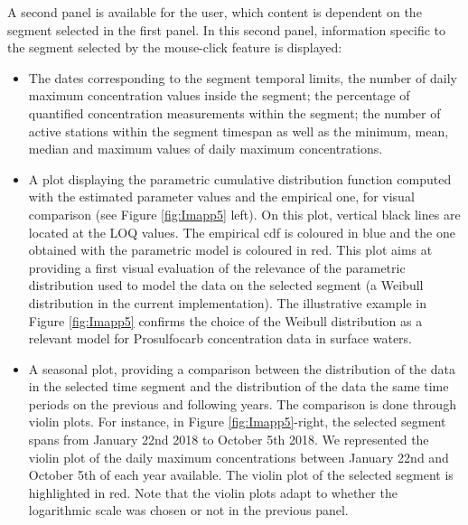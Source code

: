 A second panel is available for the user, which content is dependent on the segment selected in the first panel. In this second panel, information specific to the segment selected by the mouse-click feature is displayed:
\begin{itemize}
\item The dates corresponding to the segment temporal limits, the number of daily maximum concentration values inside the segment; the percentage of quantified concentration measurements within the segment; the number of active stations within the segment timespan as well as the minimum, mean, median and maximum values of daily maximum concentrations. 
\item A plot displaying the parametric cumulative distribution function computed with the estimated parameter values and the empirical one, for visual comparison (see Figure \ref{fig:Imapp5} left). On this plot, vertical black lines are located at the LOQ values. The empirical cdf is coloured in blue and the one obtained with the parametric model is coloured in red. This plot aims at providing a first visual evaluation of the relevance of the parametric distribution used to model the data on the selected segment (a Weibull distribution in the current implementation).  The illustrative example in Figure \ref{fig:Imapp5} confirms the choice of the Weibull distribution as a relevant model for Prosulfocarb concentration data in surface waters.
\item A seasonal plot, providing a comparison between the distribution of the data in the selected time segment and the distribution of the data the same time periods on the previous and following years. The comparison is done through violin plots. For instance, in Figure \ref{fig:Imapp5}-right, the selected segment spans from January 22nd 2018 to October 5th 2018. We represented the violin plot of the daily maximum concentrations between January 22nd and October 5th of each year available. The violin plot of the selected segment is highlighted in red. Note that the violin plots adapt to whether the logarithmic scale was chosen or not in the previous panel.
\end{itemize}  


